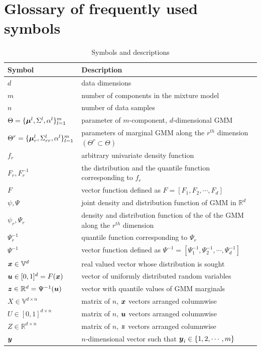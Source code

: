 \documentclass{article}
\theoremstyle{plain}
\theoremstyle{definition}
\theoremstyle{remark}
\begin{document}
\section{Glossary of frequently used symbols} \label{apd:symbol_glossary}
\begin{table}[h]
\caption{Symbols and descriptions}
\label{tab:symbol_glossary}
\begin{tabular}{ll}
\hline
\textbf{Symbol} & \textbf{Description} \\
\hline
$d$ & data dimensions \\
$m$ & number of components in the mixture model \\
$n$ & number of data samples \\
$\Theta = \{\boldsymbol{\mu}^l, \Sigma^l, \alpha^l\}_{l=1}^m$ & parameter of $m$-component, $d$-dimensional GMM \\
$\Theta^r= \{\boldsymbol{\mu}_r^l, \Sigma_{rr}^l, \alpha^l\}_{l=1}^m$ & parameters of marginal GMM along the $r^{th}$ dimension $(\Theta^r \subset \Theta)$ \\
$f_r $ & arbitrary univariate density function \\
$F_r, F_r^{-1}$ & the distribution and the quantile function corresponding to $f_r$ \\
$F$ & vector function defined as $F = [F_1, F_2,\cdots,F_d]$ \\
$\psi, \Psi$ & joint density and distribution function of GMM in $\mathbb{R}^d$ \\
$\psi_r , \Psi_r$ & density and distribution function of the of the GMM along the $r^{th}$ dimension \\
$\Psi_r^{-1}$ & quantile function corresponding to $\Psi_r$ \\
$\Psi^{-1}$ & vector function defined as $\Psi^{-1} = [\Psi_1^{-1}, \Psi_2^{-1},\cdots,\Psi_d^{-1}]$ \\
$\boldsymbol{x} \in \mathbb{V}^d$ & real valued vector whose distribution is sought \\
$\boldsymbol{u} \in [0,1]^d=F(\boldsymbol{x})$ &  vector of uniformly distributed random variables \\
$\boldsymbol{z} \in \mathbb{R}^d =\Psi^{-1}(\boldsymbol{u}) $ &  vector with quantile values of GMM marginals \\
$X \in \mathbb{V}^{d \times n}$ & matrix of $n$, $\boldsymbol{x}$ vectors arranged columnwise \\
$U \in [0,1]^{d \times n}$ & matrix of $n$, $\boldsymbol{u}$ vectors arranged columnwise \\
$Z \in \mathbb{R}^{d \times n}$ & matrix of $n$, $\boldsymbol{z}$ vectors arranged columnwise \\
$\boldsymbol{y}$ & $n$-dimensional vector such that $\boldsymbol{y}_i \in \{1,2,\cdots,m\}$ \\
\hline
\end{tabular}
\end{table}
\end{document}
